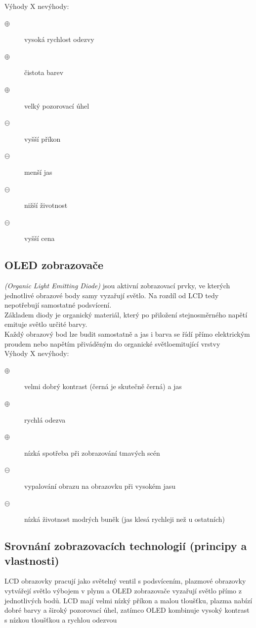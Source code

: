 Výhody X nevýhody:
\begin{description}	
	\item[$\oplus$] vysoká rychlost odezvy
	\item[$\oplus$] čistota barev
	\item[$\oplus$] velký pozorovací úhel 
	\item[$\circleddash$] vyšší příkon
	\item[$\circleddash$] menší jas
	\item[$\circleddash$] nižší životnost
	\item[$\circleddash$] vyšší cena 
\end{description}

\subsection{OLED zobrazovače}
\textit{(Organic Light Emitting Diode)} jsou aktivní zobrazovací prvky, ve kterých jednotlivé obrazové body samy vyzařují světlo. Na rozdíl od LCD tedy nepotřebují samostatné podsvícení. \\
Základem diody je organický materiál,
který po přiložení stejnosměrného
napětí emituje světlo určité barvy. \\
Každý obrazový bod lze budit samostatně a jas i barva se řídí přímo elektrickým proudem nebo napětím přiváděným do organické světloemitující vrstvy\\
Výhody X nevýhody:
\begin{description}	
	\item[$\oplus$] velmi dobrý kontrast (černá je skutečně černá) a jas
	\item[$\oplus$] rychlá odezva
	\item[$\oplus$] nízká spotřeba při zobrazování tmavých scén 
	\item[$\circleddash$] vypalování obrazu na obrazovku při vysokém jasu
	\item[$\circleddash$] nízká životnost modrých buněk (jas klesá rychleji než u ostatních)
\end{description}

\subsection{Srovnání zobrazovacích technologií (principy a vlastnosti)}
LCD obrazovky pracují jako světelný ventil s podsvícením, plazmové obrazovky vytvářejí světlo výbojem v plynu a OLED zobrazovače vyzařují světlo přímo z jednotlivých bodů. LCD mají velmi nízký příkon a malou tloušťku, plazma nabízí dobré barvy a široký pozorovací úhel, zatímco OLED kombinuje vysoký kontrast s nízkou tloušťkou a rychlou odezvou


